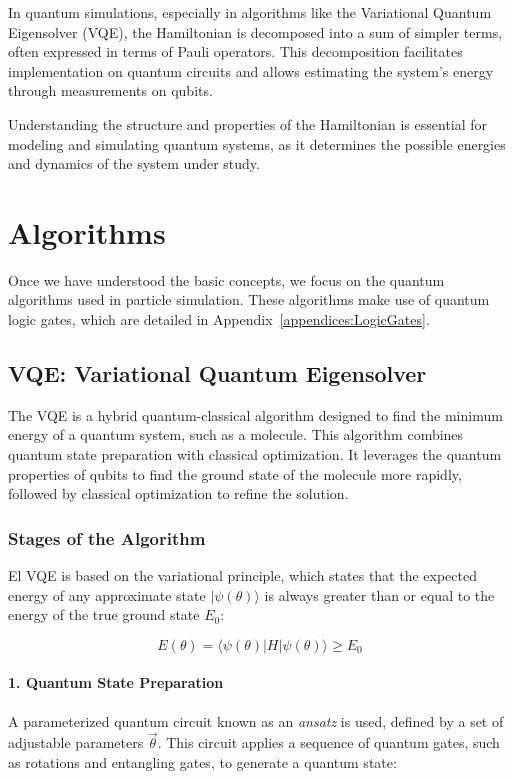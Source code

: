 In quantum simulations, especially in algorithms like the Variational Quantum Eigensolver (VQE), the Hamiltonian is decomposed into a sum of simpler terms, often expressed in terms of Pauli operators. This decomposition facilitates implementation on quantum circuits and allows estimating the system's energy through measurements on qubits.

Understanding the structure and properties of the Hamiltonian is essential for modeling and simulating quantum systems, as it determines the possible energies and dynamics of the system under study.

\section{Algorithms}

Once we have understood the basic concepts, we focus on the quantum algorithms used in particle simulation. These algorithms make use of quantum logic gates, which are detailed in Appendix~\ref{appendices:LogicGates}.

\subsection{VQE: Variational Quantum Eigensolver}

The VQE is a hybrid quantum-classical algorithm designed to find the minimum energy of a quantum system, such as a molecule. This algorithm combines quantum state preparation with classical optimization. It leverages the quantum properties of qubits to find the ground state of the molecule more rapidly, followed by classical optimization to refine the solution.

\subsubsection*{Stages of the Algorithm}
El VQE  is based on the variational principle, which states that the expected energy of any approximate state \( |\psi(\theta)\rangle \) is always greater than or equal to the energy of the true ground state \( E_0 \):

\[
E(\theta) = \langle \psi(\theta) | H | \psi(\theta) \rangle \geq E_0
\]

\paragraph{1. Quantum State Preparation}

A parameterized quantum circuit known as an \textit{ansatz} is used, defined by a set of adjustable parameters \(\vec{\theta}\). This circuit applies a sequence of quantum gates, such as rotations and entangling gates, to generate a quantum state:

